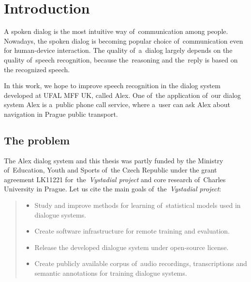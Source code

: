 \chapter{Introduction}
\label{chap:intro}

% 
% 
% 

A spoken dialog is the most intuitive way of~communication among people. Nowadays, the spoken dialog is becoming popular choice of~communication even for human-device interaction. The quality of~a~dialog largely depends on the quality of~speech recognition, because the~reasoning and the~reply is based on the recognized speech. 

In this work, we hope to improve speech recognition in the dialog system developed at UFAL MFF UK, called Alex. One of~the application of~our dialog system Alex is a~public phone call service, where a~user can ask Alex about navigation in Prague public transport.

\section{The problem} 
\label{sec:why}
The Alex dialog system and this thesis was partly funded by the Ministry of~Education, Youth and Sports
of~the Czech Republic under the grant agreement LK11221 for~the~{\it Vystadial project}\/ and core research of~Charles University in Prague.
Let us cite the main goals of~the~{\it Vystadial project}\cite{jurcicek2012vystadial}:
\begin{quote}
    \begin{itemize}
        \item Study and improve methods for learning of~statistical models used in dialogue systems. 
        \item Create software infrastructure for remote training and evaluation.
        \item Release the developed dialogue system under open-source license.
        \item Create publicly available corpus of~audio recordings, transcriptions and semantic annotations for training dialogue systems.
    \end{itemize}
\end{quote}

